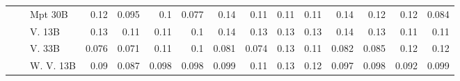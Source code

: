 \begin{table}[!htbp]
{\begin{tabular}{l|l|l|rrrr|rrrr|rrrr}
 &  & Mpt 30B & {\cellcolor[HTML]{72C375}} \color[HTML]{000000} 0.12 & {\cellcolor[HTML]{A5DB9F}} \color[HTML]{000000} 0.095 & {\cellcolor[HTML]{97D492}} \color[HTML]{000000} 0.1 & {\cellcolor[HTML]{C1E6BA}} \color[HTML]{000000} 0.077 & {\cellcolor[HTML]{FDAE6A}} \color[HTML]{000000} 0.14 & {\cellcolor[HTML]{FDD1A4}} \color[HTML]{000000} 0.11 & {\cellcolor[HTML]{FDCA99}} \color[HTML]{000000} 0.11 & {\cellcolor[HTML]{FDD1A4}} \color[HTML]{000000} 0.11 & {\cellcolor[HTML]{7669AF}} \color[HTML]{F1F1F1} 0.14 & {\cellcolor[HTML]{8D89C0}} \color[HTML]{F1F1F1} 0.12 & {\cellcolor[HTML]{9390C3}} \color[HTML]{F1F1F1} 0.12 & {\cellcolor[HTML]{BFC0DE}} \color[HTML]{000000} 0.084 \\
 &  & V. 13B  & {\cellcolor[HTML]{6DC072}} \color[HTML]{000000} 0.13 & {\cellcolor[HTML]{8ACE88}} \color[HTML]{000000} 0.11 & {\cellcolor[HTML]{90D18D}} \color[HTML]{000000} 0.11 & {\cellcolor[HTML]{9CD797}} \color[HTML]{000000} 0.1 & {\cellcolor[HTML]{FDB06E}} \color[HTML]{000000} 0.14 & {\cellcolor[HTML]{FDC088}} \color[HTML]{000000} 0.13 & {\cellcolor[HTML]{FDB87C}} \color[HTML]{000000} 0.13 & {\cellcolor[HTML]{FDC088}} \color[HTML]{000000} 0.13 & {\cellcolor[HTML]{7970B3}} \color[HTML]{F1F1F1} 0.14 & {\cellcolor[HTML]{8481BC}} \color[HTML]{F1F1F1} 0.13 & {\cellcolor[HTML]{A09DCA}} \color[HTML]{F1F1F1} 0.11 & {\cellcolor[HTML]{A19ECA}} \color[HTML]{F1F1F1} 0.11 \\
 &  & V. 33B  & {\cellcolor[HTML]{C3E7BC}} \color[HTML]{000000} 0.076 & {\cellcolor[HTML]{CBEAC4}} \color[HTML]{000000} 0.071 & {\cellcolor[HTML]{87CD86}} \color[HTML]{000000} 0.11 & {\cellcolor[HTML]{9CD797}} \color[HTML]{000000} 0.1 & {\cellcolor[HTML]{FEE1C4}} \color[HTML]{000000} 0.081 & {\cellcolor[HTML]{FEE5CC}} \color[HTML]{000000} 0.074 & {\cellcolor[HTML]{FDB77A}} \color[HTML]{000000} 0.13 & {\cellcolor[HTML]{FDD0A2}} \color[HTML]{000000} 0.11 & {\cellcolor[HTML]{C3C4E0}} \color[HTML]{000000} 0.082 & {\cellcolor[HTML]{BEBFDD}} \color[HTML]{000000} 0.085 & {\cellcolor[HTML]{8986BE}} \color[HTML]{F1F1F1} 0.12 & {\cellcolor[HTML]{9390C3}} \color[HTML]{F1F1F1} 0.12 \\
 &  & W. V. 13B  & {\cellcolor[HTML]{AEDEA7}} \color[HTML]{000000} 0.09 & {\cellcolor[HTML]{B2E0AC}} \color[HTML]{000000} 0.087 & {\cellcolor[HTML]{A2D99C}} \color[HTML]{000000} 0.098 & {\cellcolor[HTML]{A2D99C}} \color[HTML]{000000} 0.098 & {\cellcolor[HTML]{FDD5AD}} \color[HTML]{000000} 0.099 & {\cellcolor[HTML]{FDD2A6}} \color[HTML]{000000} 0.11 & {\cellcolor[HTML]{FDC088}} \color[HTML]{000000} 0.13 & {\cellcolor[HTML]{FDC794}} \color[HTML]{000000} 0.12 & {\cellcolor[HTML]{AEACD2}} \color[HTML]{000000} 0.097 & {\cellcolor[HTML]{ACAAD1}} \color[HTML]{000000} 0.098 & {\cellcolor[HTML]{B4B4D7}} \color[HTML]{000000} 0.092 & {\cellcolor[HTML]{ABA9D0}} \color[HTML]{000000} 0.099 \\

\end{tabular}}
\end{table}

